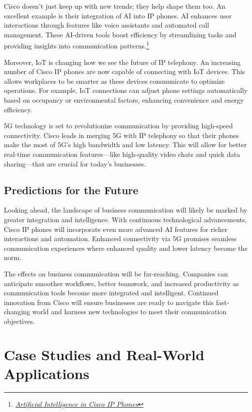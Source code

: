 \documentclass[11pt,a4paper]{article}
\begin{document}
Cisco doesn’t just keep up with new trends; they help shape them too. An excellent example is their integration of AI into IP phones. AI enhances user interactions through features like voice assistants and automated call management. These AI-driven tools boost efficiency by streamlining tasks and providing insights into communication patterns.\footnote{\href{https://www.cisco.com/c/en/us/products/collaboration-endpoints/ip-phones/index.html}{\textit{Artificial Intelligence in Cisco IP Phones}}}


Moreover, IoT is changing how we see the future of IP telephony. An increasing number of Cisco IP phones are now capable of connecting with IoT devices. This allows workplaces to be smarter as these devices communicate to optimize operations. For example, IoT connections can adjust phone settings automatically based on occupancy or environmental factors, enhancing convenience and energy efficiency.

5G technology is set to revolutionize communication by providing high-speed connectivity. Cisco leads in merging 5G with IP telephony so that their phones make the most of 5G's high bandwidth and low latency. This will allow for better real-time communication features—like high-quality video chats and quick data sharing—that are crucial for today’s businesses.

\subsection*{Predictions for the Future}

Looking ahead, the landscape of business communication will likely be marked by greater integration and intelligence. With continuous technological advancements, Cisco IP phones will incorporate even more advanced AI features for richer interactions and automation. Enhanced connectivity via 5G promises seamless communication experiences where enhanced quality and lower latency become the norm.

The effects on business communication will be far-reaching. Companies can anticipate smoother workflows, better teamwork, and increased productivity as communication tools become more integrated and intelligent. Continued innovation from Cisco will ensure businesses are ready to navigate this fast-changing world and harness new technologies to meet their communication objectives.


\section*{Case Studies and Real-World Applications}
\end{document}
